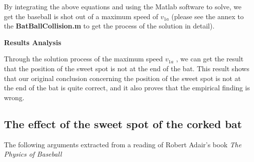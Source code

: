 By integrating the above equations and using the Matlab software to solve, we get the baseball is shot out of a maximum speed of $v_{1a}$ (please see the annex to the \textbf{BatBallCollision.m} to get the process of the solution in detail).

\textbf{Results Analysis}


Through the solution process of the maximum speed $v_{1a}$ , we can get the result that the position of the sweet spot is not at the end of the bat. This result shows that our original conclusion concerning the position of the sweet spot is not at the end of the bat is quite correct, and it also proves that the empirical finding is wrong.

\subsection{The effect of the sweet spot of the corked bat}

The following arguments extracted from a reading of Robert Adair's book \textit{The Physics of Baseball}\cite{SwingWeights}


